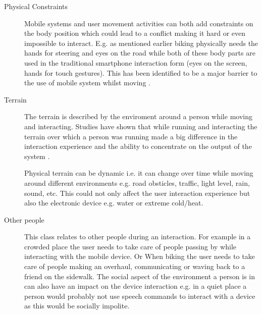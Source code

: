 \begin{description}



\item[Physical Constraints]
Mobile systems and user movement activities can both add constraints on the body position which could lead to a conflict making it hard or even impossible to interact. E.g. as mentioned earlier biking physically needs the hands for steering and eyes on the road while both of these body parts are used in the traditional smartphone interaction form (eyes on the screen, hands for touch gestures). This has been identified to be a major barrier to the use of mobile system whilst moving \cite{pielot_pocketmenu:_2012}.

\item[Terrain]
The terrain is described by the enviroment around a person while moving and interacting. Studies have shown that while running and interacting the terrain over which a person was running made a big difference in the interaction experience and the ability to concentrate on the output of the system \cite{marshall_using_2011}.

Physical terrain can be dynamic i.e. it can change over time while moving around different environments e.g. road obsticles, traffic, light level, rain, sound, etc. This could not only affect the user interaction experience but also the electronic device e.g. water or extreme cold/heat.

\item[Other people]
This class relates to other people during an interaction. For example in a crowded place the user needs to take care of people passing by while interacting with the mobile device. Or When biking the user needs to take care of people making an overhaul, communicating or waving back to a friend on the sidewalk. The social aspect of the environment a person is in can also have an impact on the device interaction e.g. in a quiet place a person would probably not use speech commands to interact with a device as this would be socially impolite.
\end{description}


